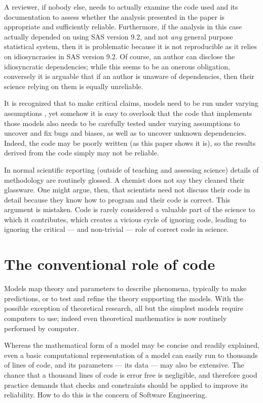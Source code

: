 \documentclass{comjnl}
\begin{document}
A reviewer, if nobody else, needs to actually examine the code used and its documentation to assess whether the analysis presented in the paper is appropriate and sufficiently reliable. Furthermore, if the analysis in this case actually depended on using SAS version 9.2, and not \emph{any\/} general purpose statistical system, then it is problematic because it is not reproducible as it relies on idiosyncrasies in SAS version 9.2. Of course, an author can disclose the idiosyncratic dependencies; while this seems to be an onerous obligation, conversely it is arguable that if an author is unaware of dependencies, then their science relying on them is equally unreliable.

It is recognized that to make critical claims, models need to be run under varying assumptions \cite{whitty}, yet somehow it is easy to overlook that the code that implements those models also needs to be carefully tested under varying assumptions to uncover and fix bugs and biases, as well as to uncover unknown dependencies. Indeed, the code may be poorly written (as this paper shows it is), so the results derived from the code simply may not be reliable. 

\label{section-vicious-cycles}
In normal scientific reporting (outside of teaching and assessing science) details of methodology are routinely glossed. A chemist does not say they cleaned their glassware. One might argue, then, that scientists need not discuss their code in detail because they know how to program and their code is correct. This argument is mistaken. Code is rarely considered a valuable part of the science to which it contributes, which creates a vicious cycle of ignoring code, leading to ignoring the critical --- and non-trivial --- role of correct code in science. 



\section{The conventional role of code}

Models map theory and parameters to describe phenomena, typically to make predictions, or to test and refine the theory supporting the models. With the possible exception of theoretical research, all but the simplest models require computers to use; indeed even theoretical mathematics is now routinely performed by computer.

Whereas the mathematical form of a model may be concise and readily explained, even a basic computational representation of a model can easily run to thousands of lines of code, and its parameters --- its data --- may also be extensive. The chance that a thousand lines of code is error free is negligible, and therefore good practice demands that checks and constraints should be applied to improve its reliability. How to do this is the concern of Software Engineering. 
\end{document}
